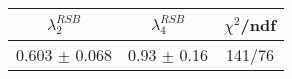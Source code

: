 \begin{tabular}{c|c||c}
$\lambda_{2}^{RSB}$ & $\lambda_4^{RSB}$ & $\chi^{2}$/ndf \\
\hline
0.603 $\pm$ 0.068 & 0.93 $\pm$ 0.16 & 141/76\\
\end{tabular}
